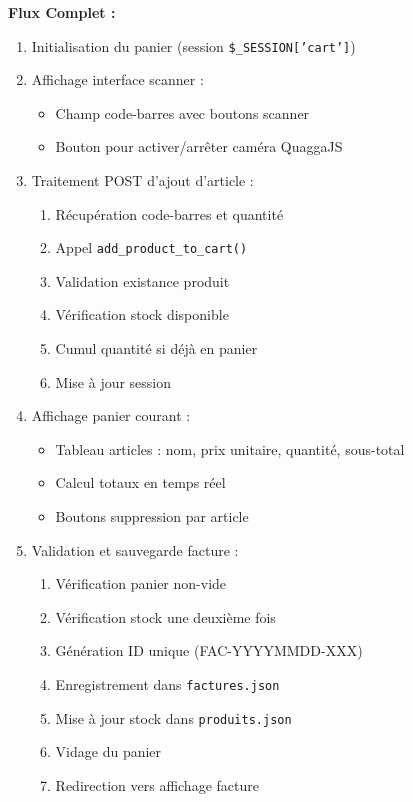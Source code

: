 \documentclass[12pt,a4paper]{report}
\begin{document}
\textbf{Flux Complet :}
\begin{enumerate}
    \item Initialisation du panier (session \texttt{\$\_SESSION['cart']})
    \item Affichage interface scanner :
        \begin{itemize}
            \item Champ code-barres avec boutons scanner
            \item Bouton pour activer/arrêter caméra QuaggaJS
        \end{itemize}
    \item Traitement POST d'ajout d'article :
        \begin{enumerate}
            \item Récupération code-barres et quantité
            \item Appel \texttt{add\_product\_to\_cart()}
            \item Validation existance produit
            \item Vérification stock disponible
            \item Cumul quantité si déjà en panier
            \item Mise à jour session
        \end{enumerate}
    \item Affichage panier courant :
        \begin{itemize}
            \item Tableau articles : nom, prix unitaire, quantité, sous-total
            \item Calcul totaux en temps réel
            \item Boutons suppression par article
        \end{itemize}
    \item Validation et sauvegarde facture :
        \begin{enumerate}
            \item Vérification panier non-vide
            \item Vérification stock une deuxième fois
            \item Génération ID unique (FAC-YYYYMMDD-XXX)
            \item Enregistrement dans \texttt{factures.json}
            \item Mise à jour stock dans \texttt{produits.json}
            \item Vidage du panier
            \item Redirection vers affichage facture
        \end{enumerate}
\end{enumerate}
\end{document}
